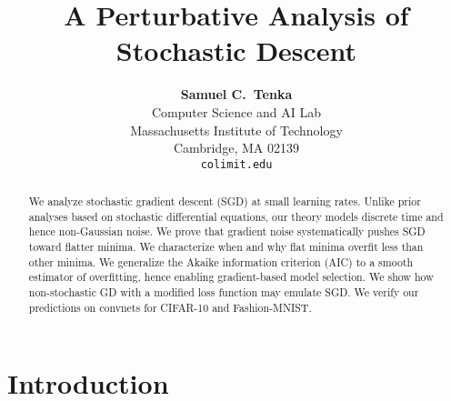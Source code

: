 \documentclass{article}
\title{%
    A Perturbative Analysis of Stochastic Descent
}
\author{%
    \textbf{Samuel C.~Tenka} \\
    Computer Science and AI Lab \\
    Massachusetts Institute of Technology \\
    Cambridge, MA 02139 \\
    \texttt{coli{\tiny@}mit.edu}
}
\theoremstyle{plain}
\theoremstyle{definition}
\begin{document}
    \maketitle

    
    
    \begin{abstract}
        We analyze stochastic gradient descent (SGD) at small learning rates.
        Unlike prior analyses based on stochastic differential equations, our
        theory models discrete time and hence non-Gaussian noise.
        We prove that gradient noise systematically pushes SGD toward flatter
        minima.  We characterize when and why flat minima overfit less than
        other minima.  We generalize the Akaike information criterion (AIC) to
        a smooth estimator of overfitting, hence enabling gradient-based model
        selection.  We show how non-stochastic GD with a modified loss function
        may emulate SGD.
        We verify our predictions on convnets for CIFAR-10 and Fashion-MNIST.
    \end{abstract}
    

\section{Introduction}


\end{document}
